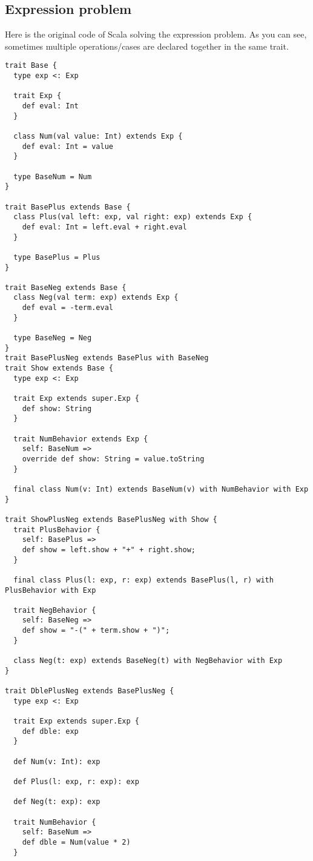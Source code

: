 \subsection{Expression problem}
Here is the original code of Scala solving the expression problem.
As you can see, sometimes multiple operations/cases are declared together in
the same trait.
\begin{lstlisting}[basicstyle=\tiny]
trait Base {
  type exp <: Exp

  trait Exp {
    def eval: Int
  }

  class Num(val value: Int) extends Exp {
    def eval: Int = value
  }

  type BaseNum = Num
}

trait BasePlus extends Base {
  class Plus(val left: exp, val right: exp) extends Exp {
    def eval: Int = left.eval + right.eval
  }

  type BasePlus = Plus
}

trait BaseNeg extends Base {
  class Neg(val term: exp) extends Exp {
    def eval = -term.eval
  }

  type BaseNeg = Neg
}
trait BasePlusNeg extends BasePlus with BaseNeg
trait Show extends Base {
  type exp <: Exp

  trait Exp extends super.Exp {
    def show: String
  }

  trait NumBehavior extends Exp {
    self: BaseNum =>
    override def show: String = value.toString
  }

  final class Num(v: Int) extends BaseNum(v) with NumBehavior with Exp
}

trait ShowPlusNeg extends BasePlusNeg with Show {
  trait PlusBehavior {
    self: BasePlus =>
    def show = left.show + "+" + right.show;
  }

  final class Plus(l: exp, r: exp) extends BasePlus(l, r) with PlusBehavior with Exp

  trait NegBehavior {
    self: BaseNeg =>
    def show = "-(" + term.show + ")";
  }
  
  class Neg(t: exp) extends BaseNeg(t) with NegBehavior with Exp
}

trait DblePlusNeg extends BasePlusNeg {
  type exp <: Exp

  trait Exp extends super.Exp {
    def dble: exp
  }

  def Num(v: Int): exp

  def Plus(l: exp, r: exp): exp

  def Neg(t: exp): exp

  trait NumBehavior {
    self: BaseNum =>
    def dble = Num(value * 2)
  }


\end{lstlisting}
